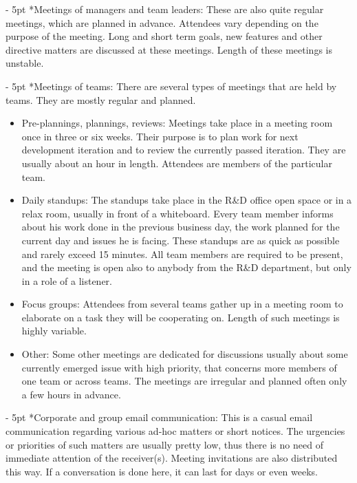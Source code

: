 \documentclass[11pt,singleside]{myfithesis2}
\makeatletter
\renewcommand\paragraph{
   \vspace{-10pt}
   \@startsection{paragraph}{4}{0mm}
      {\baselineskip}
      {- 5pt}
      {\normalfont\normalsize\bfseries}
}
\makeatother
\begin{document}
\paragraph*{Meetings of managers and team leaders: } These are also quite regular meetings, which are planned in advance. Attendees vary depending on the purpose of the meeting. Long and short term goals, new features and other directive matters are discussed at these meetings. Length of these meetings is unstable.

\paragraph*{Meetings of teams: } There are several types of meetings that are held by teams. They are mostly regular and planned.
\begin{itemize}
	\item{Pre-plannings, plannings, reviews:} Meetings take place in a meeting room once in three or six weeks. Their purpose is to plan work for next development iteration and to review the currently passed iteration. They are usually about an hour in length. Attendees are members of the particular team. 
	\item{Daily standups:} The standups take place in the R\&D office open space or in a relax room, usually in front of a whiteboard. Every team member informs about his work done in the previous business day, the work planned for the current day and issues he is facing. These standups are as quick as possible and rarely exceed 15 minutes. All team members are required to be present, and the meeting is open also to anybody from the R\&D department, but only in a role of a listener.
	\item{Focus groups:} Attendees from several teams gather up in a meeting room to elaborate on a task they will be cooperating on. Length of such meetings is highly variable.
	\item{Other:} Some other meetings are dedicated for discussions usually about some currently emerged issue with high priority, that concerns more members of one team or across teams. The meetings are irregular and planned often only a few hours in advance.
\end{itemize}

\paragraph*{Corporate and group email communication: } This is a casual email communication regarding various ad-hoc matters or short notices. The urgencies or priorities of such matters are usually pretty low, thus there is no need of immediate attention of the receiver(s). Meeting invitations are also distributed this way. If a conversation is done here, it can last for days or even weeks.
\end{document}
